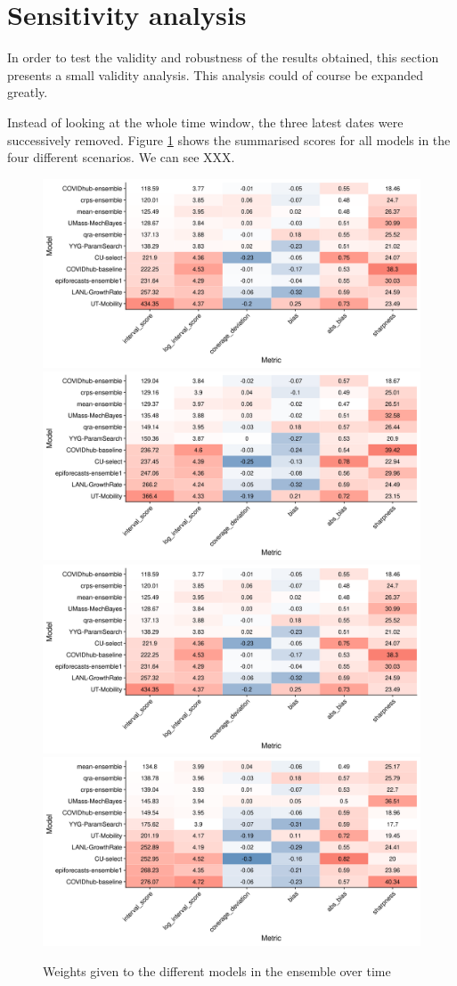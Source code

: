 \documentclass[
]{book}
\begin{document}
\hypertarget{sensitivity-analysis}{%
\section{Sensitivity analysis}\label{sensitivity-analysis}}

In order to test the validity and robustness of the results obtained, this section presents a small validity analysis. This analysis could of course be expanded greatly.

Instead of looking at the whole time window, the three latest dates were successively removed. Figure \ref{fig:senitivity} shows the summarised scores for all models in the four different scenarios. We can see XXX.

\begin{figure}
\includegraphics[width=0.5\linewidth]{../visualisation/chapter-5-results/scenario-baseline/coloured-summarised-scores} \includegraphics[width=0.5\linewidth]{../visualisation/chapter-5-results/scenario-1/coloured-summarised-scores} \includegraphics[width=0.5\linewidth]{../visualisation/chapter-5-results/scenario-2/coloured-summarised-scores} \includegraphics[width=0.5\linewidth]{../visualisation/chapter-5-results/scenario-3/coloured-summarised-scores} \caption{Weights given to the different models in the ensemble over time}\label{fig:senitivity}
\end{figure}
\end{document}
